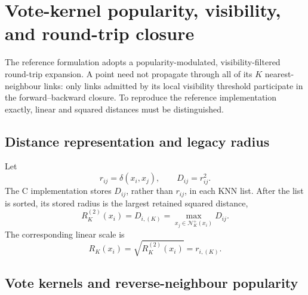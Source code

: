 \documentclass[pdflatex,sn-mathphys-num]{sn-jnl}
\newcommand{\calN}{\mathcal{N}}
\begin{document}
\section{Vote-kernel popularity, visibility, and round-trip closure}\label{sec:visibility_closure}

The reference formulation adopts a popularity-modulated, visibility-filtered round-trip expansion. A point need not propagate through all of its $K$ nearest-neighbour links: only links admitted by its local visibility threshold participate in the forward--backward closure. To reproduce the reference implementation exactly, linear and squared distances must be distinguished.

\subsection{Distance representation and legacy radius}

Let
\begin{equation}
r_{ij}=\delta(x_i,x_j),
\qquad
D_{ij}=r_{ij}^{2}.
\label{eq:linear_squared_distance}
\end{equation}
The C implementation stores $D_{ij}$, rather than $r_{ij}$, in each KNN list. After the list is sorted, its stored radius is the largest retained squared distance,
\begin{equation}
R_K^{(2)}(x_i)=D_{i,(K)}
=\max_{x_j\in\calN_K^+(x_i)}D_{ij}.
\label{eq:legacy_radius}
\end{equation}
The corresponding linear scale is
\begin{equation}
R_K(x_i)=\sqrt{R_K^{(2)}(x_i)}=r_{i,(K)}.
\label{eq:linear_knn_radius}
\end{equation}

\subsection{Vote kernels and reverse-neighbour popularity}
\end{document}
